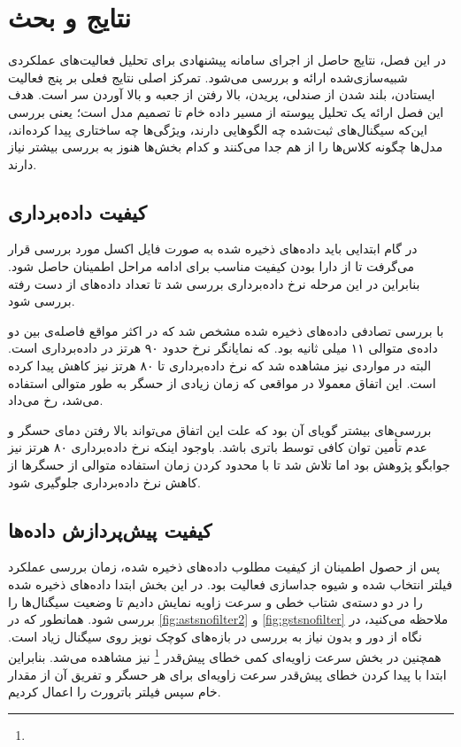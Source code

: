 \section{نتایج و بحث}

در این فصل، نتایج حاصل از اجرای سامانه پیشنهادی برای تحلیل فعالیت‌های عملکردی شبیه‌سازی‌شده ارائه و بررسی می‌شود. تمرکز اصلی نتایج فعلی بر پنج فعالیت ایستادن، بلند شدن از صندلی، پریدن، بالا رفتن از جعبه و بالا آوردن سر است. هدف این فصل ارائه یک تحلیل پیوسته از مسیر داده خام تا تصمیم مدل است؛ یعنی بررسی این‌که سیگنال‌های ثبت‌شده چه الگوهایی دارند، ویژگی‌ها چه ساختاری پیدا کرده‌اند، مدل‌ها چگونه کلاس‌ها را از هم جدا می‌کنند و کدام بخش‌ها هنوز به بررسی بیشتر نیاز دارند.

\subsection{کیفیت داده‌برداری}

در گام ابتدایی باید داده‌های ذخیره شده به صورت فایل اکسل مورد بررسی قرار می‌گرفت تا از دارا بودن کیفیت مناسب برای ادامه مراحل اطمینان حاصل شود. بنابراین در این مرحله نرخ داده‌برداری بررسی شد تا تعداد داده‌های از دست رفته بررسی شود.

با بررسی تصادفی داده‌های ذخیره شده مشخص شد که در اکثر مواقع فاصله‌ی بین دو داده‌ی متوالی ۱۱ میلی‌ ثانیه بود. که نمایانگر نرخ حدود ۹۰ هرتز در داده‌برداری است. البته در مواردی نیز مشاهده شد که نرخ داده‌برداری تا ۸۰ هرتز نیز کاهش پیدا کرده است. این اتفاق معمولا در مواقعی که زمان زیادی از حسگر به طور متوالی استفاده می‌شد، رخ می‌داد. 

بررسی‌های بیشتر گویای آن بود که علت این اتفاق می‌تواند بالا رفتن دمای حسگر و عدم تأمین توان کافی توسط باتری باشد. باوجود اینکه نرخ داده‌برداری ۸۰ هرتز نیز جوابگو پژوهش بود اما تلاش شد تا با محدود کردن زمان استفاده متوالی از حسگر‌ها از کاهش نرخ داده‌برداری جلوگیری شود.

\subsection{کیفیت پیش‌پردازش داده‌ها}

پس از حصول اطمینان از کیفیت مطلوب داده‌های ذخیره شده، زمان بررسی عملکرد فیلتر انتخاب شده و شیوه جداسازی فعالیت بود. در این بخش ابتدا داده‌های ذخیره شده را در دو دسته‌ی شتاب خطی و سرعت زاویه نمایش دادیم تا وضعیت سیگنال‌ها را بررسی شود.
 همانطور که در 
 \autoref{fig:astsnofilter2}
 و
  \autoref{fig:gstsnofilter}
 ملاحظه می‌کنید، در نگاه از دور و بدون نیاز به بررسی در بازه‌های کوچک نویز روی سیگنال زیاد است. همچنین در بخش سرعت زاویه‌ای کمی خطای پیش‌قدر
 \footnote{}
 نیز مشاهده می‌شد. بنابراین ابتدا با پیدا کردن خطای پیش‌قدر سرعت زاویه‌ای برای هر حسگر و تفریق آن از مقدار خام سپس فیلتر باترورث را اعمال کردیم.
 
